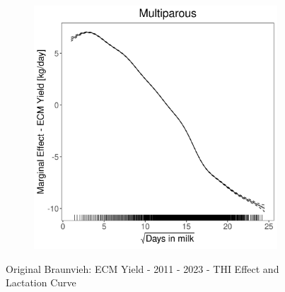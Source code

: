 \begin{figure}[H]
\begin{subfigure}[b]{0.45\textwidth}
    \end{subfigure}
    \hspace{0.05\textwidth} %
    \begin{subfigure}[b]{0.45\textwidth}
        \centering
        \includegraphics[width=\textwidth]{thesis/figures/models/ecm/after2010/ob_ecm_after2010/ob_ecm_after2010_marginal_dim_milk_multi.png}
    \end{subfigure}
    \caption[]{Original Braunvieh: ECM Yield - 2011 - 2023 - THI Effect and Lactation Curve}
    \label{fig:main}
\end{figure}
